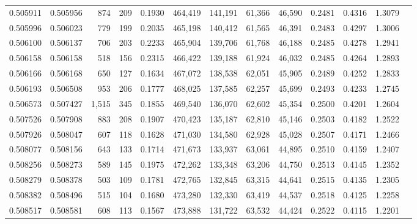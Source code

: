 \begin{tabular}{rrrrrrrrrrrrr}
0.505911 & 0.505956 &   874 &   209 &                                     0.1930 & 464,419 & 141,191 &  61,366 &  46,590 & 0.2481 & 0.4316 & 1.3079 \\
0.505996 & 0.506023 &   779 &   199 &                                     0.2035 & 465,198 & 140,412 &  61,565 &  46,391 & 0.2483 & 0.4297 & 1.3006 \\
0.506100 & 0.506137 &   706 &   203 &                                     0.2233 & 465,904 & 139,706 &  61,768 &  46,188 & 0.2485 & 0.4278 & 1.2941 \\
0.506158 & 0.506158 &   518 &   156 &                                     0.2315 & 466,422 & 139,188 &  61,924 &  46,032 & 0.2485 & 0.4264 & 1.2893 \\
0.506166 & 0.506168 &   650 &   127 &                                     0.1634 & 467,072 & 138,538 &  62,051 &  45,905 & 0.2489 & 0.4252 & 1.2833 \\
0.506193 & 0.506508 &   953 &   206 &                                     0.1777 & 468,025 & 137,585 &  62,257 &  45,699 & 0.2493 & 0.4233 & 1.2745 \\
0.506573 & 0.507427 & 1,515 &   345 &                                     0.1855 & 469,540 & 136,070 &  62,602 &  45,354 & 0.2500 & 0.4201 & 1.2604 \\
0.507526 & 0.507908 &   883 &   208 &                                     0.1907 & 470,423 & 135,187 &  62,810 &  45,146 & 0.2503 & 0.4182 & 1.2522 \\
0.507926 & 0.508047 &   607 &   118 &                                     0.1628 & 471,030 & 134,580 &  62,928 &  45,028 & 0.2507 & 0.4171 & 1.2466 \\
0.508077 & 0.508156 &   643 &   133 &                                     0.1714 & 471,673 & 133,937 &  63,061 &  44,895 & 0.2510 & 0.4159 & 1.2407 \\
0.508256 & 0.508273 &   589 &   145 &                                     0.1975 & 472,262 & 133,348 &  63,206 &  44,750 & 0.2513 & 0.4145 & 1.2352 \\
0.508279 & 0.508378 &   503 &   109 &                                     0.1781 & 472,765 & 132,845 &  63,315 &  44,641 & 0.2515 & 0.4135 & 1.2305 \\
0.508382 & 0.508496 &   515 &   104 &                                     0.1680 & 473,280 & 132,330 &  63,419 &  44,537 & 0.2518 & 0.4125 & 1.2258 \\
0.508517 & 0.508581 &   608 &   113 &                                     0.1567 & 473,888 & 131,722 &  63,532 &  44,424 & 0.2522 & 0.4115 & 1.2201 \\

\end{tabular}
